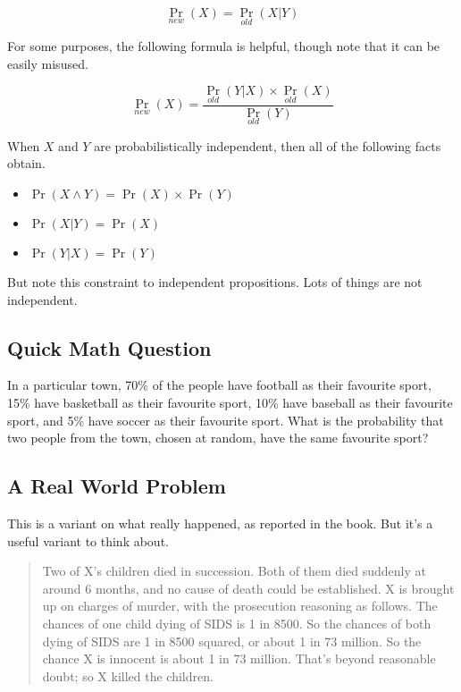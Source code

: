 \documentclass[11pt,]{article}
\providecommand{\tightlist}{%
  \setlength{\itemsep}{0pt}\setlength{\parskip}{0pt}}
\begin{document}
\[
\Pr_{new}(X) = \Pr_{old}(X | Y)
\]

For some purposes, the following formula is helpful, though note that it
can be easily misused.

\[
\Pr_{new}(X) = \frac{\Pr_{old}(Y | X) \times \Pr_{old}(X)}{\Pr_{old}(Y)}
\]

When \(X\) and \(Y\) are probabilistically independent, then all of the
following facts obtain.

\begin{itemize}
\tightlist
\item
  \(\Pr(X \wedge Y) = \Pr(X) \times \Pr(Y)\)
\item
  \(\Pr(X | Y) = \Pr(X)\)
\item
  \(\Pr(Y | X) = \Pr(Y)\)
\end{itemize}

But note this constraint to independent propositions. Lots of things are
not independent.

\hypertarget{quick-math-question}{%
\subsection{Quick Math Question}\label{quick-math-question}}

In a particular town, 70\% of the people have football as their
favourite sport, 15\% have basketball as their favourite sport, 10\%
have baseball as their favourite sport, and 5\% have soccer as their
favourite sport. What is the probability that two people from the town,
chosen at random, have the same favourite sport?

\hypertarget{a-real-world-problem}{%
\subsection{A Real World Problem}\label{a-real-world-problem}}

This is a variant on what really happened, as reported in the book. But
it's a useful variant to think about.

\begin{quote}
Two of X's children died in succession. Both of them died suddenly at
around 6 months, and no cause of death could be established. X is
brought up on charges of murder, with the prosecution reasoning as
follows. The chances of one child dying of SIDS is 1 in 8500. So the
chances of both dying of SIDS are 1 in 8500 squared, or about 1 in 73
million. So the chance X is innocent is about 1 in 73 million. That's
beyond reasonable doubt; so X killed the children.
\end{quote}
\end{document}

